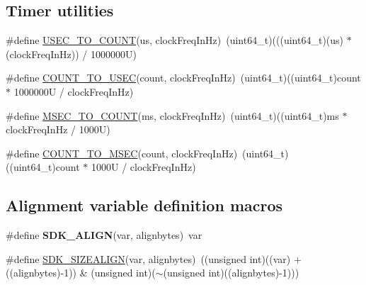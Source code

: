 \subsection*{Timer utilities}
\begin{DoxyCompactItemize}
\item 
\#define \mbox{\hyperlink{group__ksdk__common_gad5639aadf668899775fc7506a5e19dc1}{U\+S\+E\+C\+\_\+\+T\+O\+\_\+\+C\+O\+U\+NT}}(us,  clock\+Freq\+In\+Hz)~(uint64\+\_\+t)(((uint64\+\_\+t)(us) $\ast$ (clock\+Freq\+In\+Hz)) / 1000000\+U)
\item 
\#define \mbox{\hyperlink{group__ksdk__common_ga601b69842ec962d1babd627e5a3541fd}{C\+O\+U\+N\+T\+\_\+\+T\+O\+\_\+\+U\+S\+EC}}(count,  clock\+Freq\+In\+Hz)~(uint64\+\_\+t)((uint64\+\_\+t)count $\ast$ 1000000\+U / clock\+Freq\+In\+Hz)
\item 
\#define \mbox{\hyperlink{group__ksdk__common_gaa9fb2136029d807bd7c349c30348b52a}{M\+S\+E\+C\+\_\+\+T\+O\+\_\+\+C\+O\+U\+NT}}(ms,  clock\+Freq\+In\+Hz)~(uint64\+\_\+t)((uint64\+\_\+t)ms $\ast$ clock\+Freq\+In\+Hz / 1000\+U)
\item 
\#define \mbox{\hyperlink{group__ksdk__common_gafa0fe6bd95d5455c99aee949cb285b20}{C\+O\+U\+N\+T\+\_\+\+T\+O\+\_\+\+M\+S\+EC}}(count,  clock\+Freq\+In\+Hz)~(uint64\+\_\+t)((uint64\+\_\+t)count $\ast$ 1000\+U / clock\+Freq\+In\+Hz)
\end{DoxyCompactItemize}
\subsection*{Alignment variable definition macros}
\begin{DoxyCompactItemize}
\item 
\mbox{\label{group__ksdk__common_gade00270528e66e9f091cc49d1ac2212c}} 
\#define {\bfseries S\+D\+K\+\_\+\+A\+L\+I\+GN}(var,  alignbytes)~var
\item 
\#define \mbox{\hyperlink{group__ksdk__common_ga44d24ac5229dbbd054f046331b58d43b}{S\+D\+K\+\_\+\+S\+I\+Z\+E\+A\+L\+I\+GN}}(var,  alignbytes)~((unsigned int)((var) + ((alignbytes)-\/1)) \& (unsigned int)($\sim$(unsigned int)((alignbytes)-\/1)))
\end{DoxyCompactItemize}
